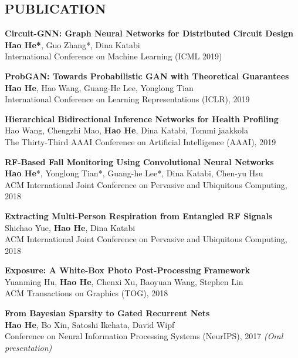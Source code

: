 \documentclass[margin]{res}
\begin{document}
\begin{resume}
\section{PUBLICATION}
\textbf{Circuit-GNN: Graph Neural Networks for Distributed Circuit Design}\\
\textbf{Hao He*}, Guo Zhang*, Dina Katabi\\
International Conference on Machine Learning (ICML 2019)

\textbf{ProbGAN: Towards Probabilistic GAN with Theoretical Guarantees}\\
\textbf{Hao He}, Hao Wang, Guang-He Lee, Yonglong Tian\\
International Conference on Learning Representations (ICLR), 2019

\textbf{Hierarchical Bidirectional Inference Networks for Health Profiling}\\
Hao Wang, Chengzhi Mao, \textbf{Hao He}, Dina Katabi, Tommi jaakkola\\
The Thirty-Third AAAI Conference on Artificial Intelligence (AAAI), 2019

\textbf{RF-Based Fall Monitoring Using Convolutional Neural Networks}\\
\textbf{Hao He}*, Yonglong Tian*, Guang-he Lee*, Dina Katabi, Chen-yu Hsu\\
ACM International Joint Conference on Pervasive and Ubiquitous Computing, 2018

\textbf{Extracting Multi-Person Respiration from Entangled RF Signals}\\
Shichao Yue, \textbf{Hao He}, Dina Katabi \\
ACM International Joint Conference on Pervasive and Ubiquitous Computing, 2018

\textbf{Exposure: A White-Box Photo Post-Processing Framework}\\
Yuanming Hu, \textbf{Hao He}, Chenxi Xu, Baoyuan Wang, Stephen Lin\\
ACM Transactions on Graphics (TOG), 2018

\textbf{From Bayesian Sparsity to Gated Recurrent Nets}\\
\textbf{Hao He}, Bo Xin, Satoshi Ikehata, David Wipf\\
Conference on Neural Information Processing Systems (NeurIPS), 2017 \emph{(Oral presentation)}


\end{resume}
\end{document}

